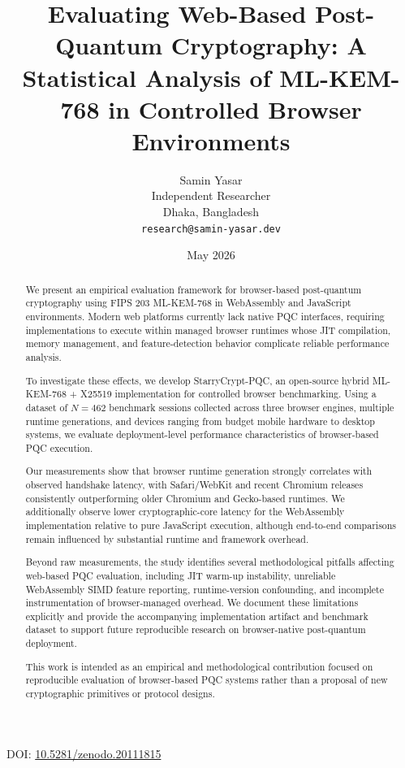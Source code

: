 \documentclass[11pt,a4paper]{article}
\title{Evaluating Web-Based Post-Quantum Cryptography: A Statistical Analysis of ML-KEM-768 in Controlled Browser Environments}
\author{Samin Yasar\\
    Independent Researcher\\
    Dhaka, Bangladesh\\
    \texttt{research@samin-yasar.dev}}
\date{May 2026}
\begin{document}
\maketitle

\vspace{-0.5em}
\begin{center}
\small DOI: \href{https://doi.org/10.5281/zenodo.20111815}{10.5281/zenodo.20111815}
\end{center}
\vspace{1em}

\begin{abstract}
\noindent
We present an empirical evaluation framework for browser-based post-quantum cryptography using FIPS 203 ML-KEM-768 in WebAssembly and JavaScript environments. Modern web platforms currently lack native PQC interfaces, requiring implementations to execute within managed browser runtimes whose JIT compilation, memory management, and feature-detection behavior complicate reliable performance analysis.

To investigate these effects, we develop StarryCrypt-PQC, an open-source hybrid ML-KEM-768 + X25519 implementation for controlled browser benchmarking. Using a dataset of $N = 462$ benchmark sessions collected across three browser engines, multiple runtime generations, and devices ranging from budget mobile hardware to desktop systems, we evaluate deployment-level performance characteristics of browser-based PQC execution.

Our measurements show that browser runtime generation strongly correlates with observed handshake latency, with Safari/WebKit and recent Chromium releases consistently outperforming older Chromium and Gecko-based runtimes. We additionally observe lower cryptographic-core latency for the WebAssembly implementation relative to pure JavaScript execution, although end-to-end comparisons remain influenced by substantial runtime and framework overhead.

Beyond raw measurements, the study identifies several methodological pitfalls affecting web-based PQC evaluation, including JIT warm-up instability, unreliable WebAssembly SIMD feature reporting, runtime-version confounding, and incomplete instrumentation of browser-managed overhead. We document these limitations explicitly and provide the accompanying implementation artifact and benchmark dataset to support future reproducible research on browser-native post-quantum deployment.

This work is intended as an empirical and methodological contribution focused on reproducible evaluation of browser-based PQC systems rather than a proposal of new cryptographic primitives or protocol designs.

\end{abstract}
\end{document}
